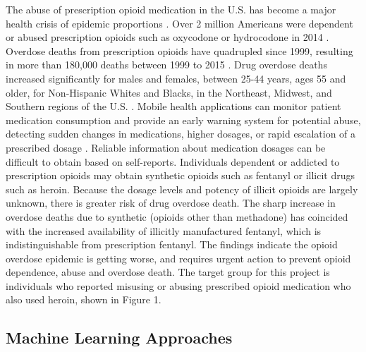 \documentclass[sigconf]{acmart}
\begin{document}
The abuse of prescription opioid medication in the U.S. has become a major 
health crisis of epidemic proportions \cite{volkow14}. Over 2 million Americans 
were dependent or abused prescription opioids such as oxycodone or hydrocodone 
in 2014 \cite{cdc17}. Overdose deaths from prescription opioids have quadrupled 
since 1999, resulting in more than 180,000 deaths between 1999 to 2015 
\cite{nida17}. Drug overdose deaths increased significantly for males and 
females, between 25-44 years, ages 55 and older, for Non-Hispanic Whites and 
Blacks, in the Northeast, Midwest, and Southern regions of the U.S. 
\cite{cdc16}. Mobile health applications can monitor patient medication 
consumption and provide an early warning system for potential abuse, detecting 
sudden changes in medications, higher dosages, or rapid escalation of a 
prescribed dosage \cite{varshney13}. Reliable information about medication 
dosages can be difficult to obtain based on self-reports. Individuals dependent 
or addicted to prescription opioids may obtain synthetic opioids such as 
fentanyl or illicit drugs such as heroin. Because the dosage levels and potency 
of illicit opioids are largely unknown, there is greater risk of drug overdose 
death. The sharp increase in overdose deaths due to synthetic (opioids other 
than methadone) has coincided with the increased availability of illicitly
manufactured fentanyl, which is indistinguishable from prescription fentanyl. 
The findings indicate the opioid overdose epidemic is getting worse, and 
requires urgent action to prevent opioid dependence, abuse and overdose death. 
The target group for this project is individuals who reported misusing or 
abusing prescribed opioid medication who also used heroin, shown in Figure 1. 

\subsection{Machine Learning Approaches} 
\end{document}
